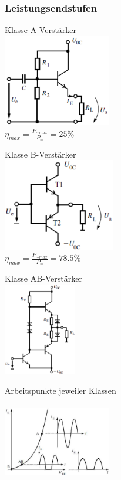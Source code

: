     \subsubsection{Leistungsendstufen}
      \begin{minipage}[T]{4.7cm}
        Klasse A-Verst\"arker\\
        \includegraphics[height=4cm]{./bilder/KlassA_Amp.png}\\
        $\eta_{max} = \frac{P_{\sim max}}{P_=} = 25\%$
      \end{minipage}
      \begin{minipage}[T]{4.7cm}
        Klasse B-Verst\"arker\\
        \includegraphics[height=4cm]{./bilder/KlassB_Amp.png} \\
        $\eta_{max} = \frac{P_{\sim max}}{P_=} = 78.5\%$
      \end{minipage}
      \begin{minipage}[T]{4.7cm}
        Klasse AB-Verst\"arker\\
        \includegraphics[height=4cm]{./bilder/KlassAB_Amp.png}
      \end{minipage}
      \begin{minipage}[T]{4.7cm}
        Arbeitspunkte jeweiler Klassen\\\\
        \vspace{5mm}
        \includegraphics[width=4.7cm]{./bilder/EndstufenAP.png}
      \end{minipage}
      
